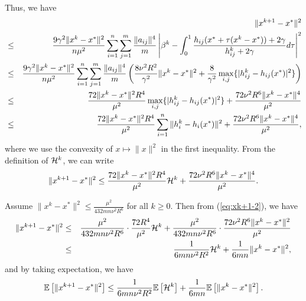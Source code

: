\documentclass[12pt]{article}
\newcommand{\ExpBr}[1]{\mathbb{E}\left[#1\right]}
\newcommand{\newalpha}{h}
\begin{document}
\noindent Thus, we have 
\begin{eqnarray}
&&\|x^{k+1} - x^*\|^2\notag\\
&\leq& \frac{9\gamma^2\|x^k - x^*\|^2}{n \mu^2} \sum_{i=1}^n \sum_{j=1}^{m} \frac{\|a_{ij}\|^4}{m} \left|   \beta^k - \int_{0}^1 \frac{\newalpha_{ij}(x^* + \tau(x^k - x^*)) + 2\gamma}{ h_{ij}^k + 2\gamma} d\tau   \right|^2 \nonumber \\ 
&\leq& \frac{9\gamma^2\|x^k - x^*\|^2}{n \mu^2} \sum_{i=1}^n \sum_{j=1}^{m} \frac{\|a_{ij}\|^4}{m} \left(  \frac{8\nu^2 R^2}{\gamma^2} \|x^k - x^*\|^2 + \frac{8}{\gamma^2} \max_{i, j} \{|h_{ij}^k - \newalpha_{ij}(x^*)|^2 \}    \right) \nonumber \\ 
&\leq& \frac{72\|x^k - x^*\|^2 R^4}{\mu^2} \max_{i, j} \{|h_{ij}^k - \newalpha_{ij}(x^*)|^2 \}  +   \frac{72\nu^2 R^6\|x^k - x^*\|^4 }{\mu^2} \label{eq:forinitiallm} \\ 
&\leq&  \frac{72\|x^k - x^*\|^2 R^4}{\mu^2} \sum_{i=1}^n \|h_i^k - \newalpha_i(x^*)\|^2 +   \frac{72\nu^2 R^6\|x^k - x^*\|^4 }{\mu^2}, \nonumber 
\end{eqnarray}
where we use the convexity of $x\mapsto \|x\|^2$ in the first inequality. From the definition of ${\cal H}^k$, we can write 
\begin{equation}\label{eq:xk+1-2}
\|x^{k+1} - x^*\|^2 \leq  \frac{72\|x^k - x^*\|^2 R^4}{\mu^2} {\cal H}^k +   \frac{72\nu^2 R^6\|x^k - x^*\|^4 }{\mu^2}. 
\end{equation}


\noindent Assume $\|x^k - x^*\|^2 \leq \frac{\mu^2}{432m n \nu^2R^6}$ for all $k\geq 0$. Then from (\ref{eq:xk+1-2}), we have 
\begin{eqnarray*}
	\|x^{k+1} - x^*\|^2 &\leq& \frac{\mu^2}{432 mn\nu^2 R^6} \cdot \frac{72R^4}{\mu^2}{\cal H}^k + \frac{\mu^2}{432mn\nu^2 R^6} \cdot \frac{ 72\nu^2 R^6\|x^k-x^*\|^2}{\mu^2} \\ 
	&\leq& \frac{1}{6mn \nu^2 R^2} {\cal H}^k + \frac{1}{6mn} \|x^k - x^*\|^2, 
\end{eqnarray*}
and by taking expectation, we have 
\begin{equation}\label{eq:expxk+1-2}
\ExpBr{\|x^{k+1} - x^*\|^2} \leq  \frac{1}{6mn \nu^2 R^2} \ExpBr{{\cal H}^k} + \frac{1}{6mn} \ExpBr{ \|x^k - x^*\|^2}. 
\end{equation}
\end{document}
